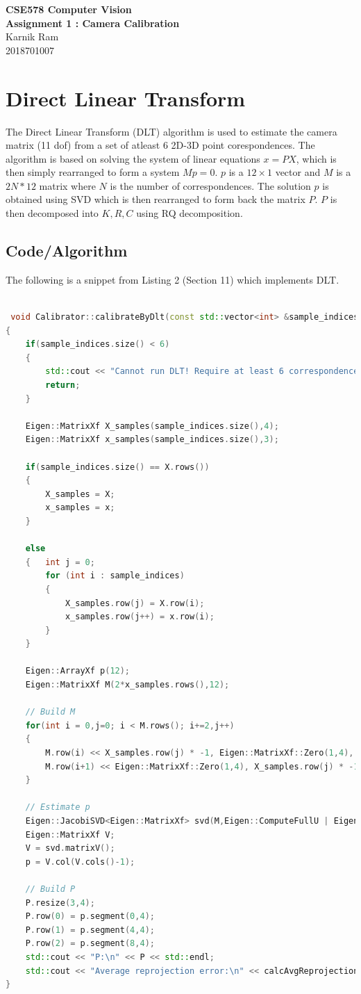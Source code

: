 \documentclass[a4paper,11pt]{article}
\begin{document}
 \begin{center}
  \large{\textbf{CSE578 Computer Vision}}\\
  \Large{\textbf{Assignment 1 : Camera Calibration}}\\
  \vspace{1em}
  Karnik Ram\\
  2018701007
 \end{center}
 
 \section{Direct Linear Transform}
 
 The Direct Linear Transform (DLT) algorithm is used to estimate the camera matrix (11 dof) from a set of atleast 6 2D-3D point corespondences. The algorithm is based on solving the system of linear equations $x = PX$, which is then simply rearranged to form a system $Mp = 0$. $p$ is a $12 \times 1$ vector and $M$ is a $2N * 12$ matrix where $N$ is the number of correspondences. The solution $p$ is obtained using SVD which is then rearranged to form back the matrix $P$. $P$ is then decomposed into $K,R,C$ using RQ decomposition.
 
  \subsection{Code/Algorithm}
  The following is a snippet from Listing 2 (Section 11) which implements DLT.
  \begin{lstlisting}[language=C++]
  
 void Calibrator::calibrateByDlt(const std::vector<int> &sample_indices)
{
	if(sample_indices.size() < 6)
	{
		std::cout << "Cannot run DLT! Require at least 6 correspondences.\n";
		return;
	}

	Eigen::MatrixXf X_samples(sample_indices.size(),4);
	Eigen::MatrixXf x_samples(sample_indices.size(),3);

	if(sample_indices.size() == X.rows())
	{
		X_samples = X;
		x_samples = x;
	}

	else
	{	int j = 0;	
		for (int i : sample_indices)
		{
			X_samples.row(j) = X.row(i);
			x_samples.row(j++) = x.row(i);
		}
	}

	Eigen::ArrayXf p(12);
	Eigen::MatrixXf M(2*x_samples.rows(),12);

	// Build M
	for(int i = 0,j=0; i < M.rows(); i+=2,j++)
	{
		M.row(i) << X_samples.row(j) * -1, Eigen::MatrixXf::Zero(1,4), X_samples.row(j) * x_samples(j,0);
		M.row(i+1) << Eigen::MatrixXf::Zero(1,4), X_samples.row(j) * -1, X_samples.row(j) * x_samples(j,1);
	}

	// Estimate p
	Eigen::JacobiSVD<Eigen::MatrixXf> svd(M,Eigen::ComputeFullU | Eigen::ComputeFullV);
	Eigen::MatrixXf V;
	V = svd.matrixV();
	p = V.col(V.cols()-1);

	// Build P
 	P.resize(3,4);
	P.row(0) = p.segment(0,4);
	P.row(1) = p.segment(4,4);
	P.row(2) = p.segment(8,4);
	std::cout << "P:\n" << P << std::endl;
	std::cout << "Average reprojection error:\n" << calcAvgReprojectionError() << std::endl;
} 
  \end{lstlisting}
\end{document}
